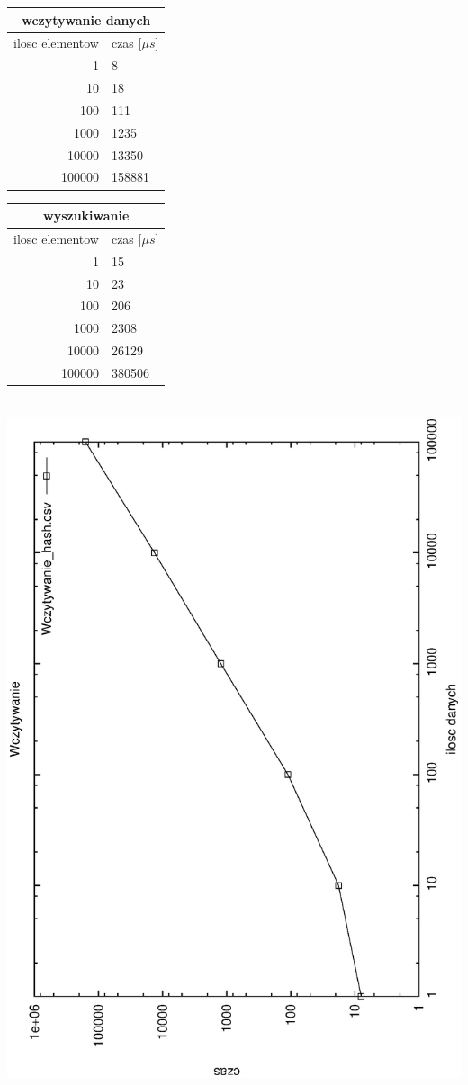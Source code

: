 \documentclass[a4paper,11pt]{report}
\begin{document}
\begin{tabular}{|rl|}
\hline
\multicolumn{2}{|c|}{wczytywanie danych}\\
\hline
ilosc elementow & czas [$\mu s$]\\
\hline
1&8\\
10&18\\
100&111\\
1000&1235\\
10000&13350\\
100000&158881\\
\hline
\end{tabular}
\newline
\newline
\begin{tabular}{|rl|}
\hline
\multicolumn{2}{|c|}{wyszukiwanie}\\
\hline
ilosc elementow & czas [$\mu s$]\\
\hline
1&15\\
10&23\\
100&206\\
1000&2308\\
10000&26129\\
100000&380506\\
\hline
\end{tabular}
\\
\includegraphics[angle=270, scale = 0.5]{wykresy/wczytywanie_hash.eps}
\end{document}
